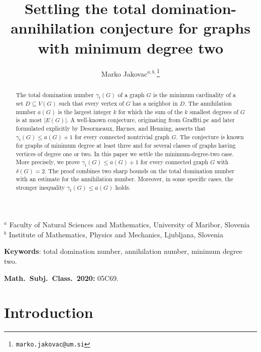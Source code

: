 \documentclass[12pt]{article}
\begin{document}
\title{Settling the total domination-annihilation conjecture for graphs with minimum degree two}

\author{Marko Jakovac$^{a,b,}$\thanks{\texttt{marko.jakovac@um.si}}}
\maketitle

\begin{center}
\vspace*{-0.7cm}
$^a$ Faculty of Natural Sciences and Mathematics, University of Maribor, Slovenia\\

\medskip
$^b$ Institute of Mathematics, Physics and Mechanics, Ljubljana, Slovenia
\end{center}

\begin{abstract}
The total domination number $\gamma_t(G)$ of a graph $G$ is the minimum cardinality of a set $D\subseteq V(G)$ such that every vertex of $G$ has a neighbor in $D$. The annihilation number $a(G)$ is the largest integer $k$ for which the sum of the $k$ smallest degrees of $G$ is at most $|E(G)|$. A well-known conjecture, originating from Graffiti.pc and later formulated explicitly by Desormeaux, Haynes, and Henning, asserts that $\gamma_t(G)\le a(G)+1$ for every connected nontrivial graph $G$. The conjecture is known for graphs of minimum degree at least three and for several classes of graphs having vertices of degree one or two. In this paper we settle the minimum-degree-two case. More precisely, we prove $\gamma_t(G)\le a(G)+1$ for every connected graph $G$ with $\delta(G)=2$. The proof combines two sharp bounds on the total domination number with an estimate for the annihilation number. Moreover, in some specific cases, the stronger inequality $\gamma_t(G)\le a(G)$ holds. 
\end{abstract}

\vspace{5mm}

\noindent
\textbf{Keywords}: total domination number, annihilation number, minimum degree two.

\vspace{5mm}

\noindent
\textbf{Math.\ Subj.\ Class.\ 2020:} 05C69.


\section{Introduction}
\end{document}
